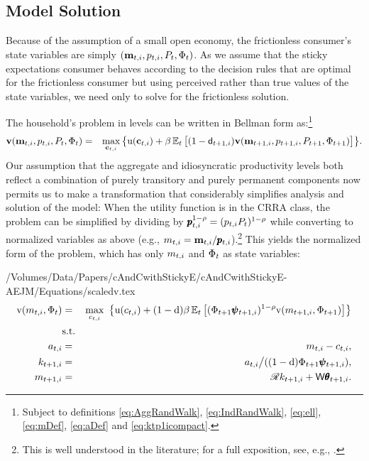 \subsection{Model Solution}

Because of the assumption of a small open economy, the frictionless consumer's state variables are simply $(\mathbf{m}_{t,i},p_{t,i},P_t,\Phi_t)$.  As we assume that the sticky expectations consumer behaves according to the decision rules that are optimal for the frictionless consumer but using perceived rather than true values of the state variables, we need only to solve for the frictionless solution.

The household's problem in levels can be written in Bellman form as:\footnote{Subject to definitions \eqref{eq:AggRandWalk}, \eqref{eq:IndRandWalk}, \eqref{eq:ell}, \eqref{eq:mDef}, \eqref{eq:aDef} and \eqref{eq:ktp1icompact}.}
\begin{eqnarray*}
\textbf{v}(\mathbf{m}_{t,i},p_{t,i},P_t,\Phi_t)  & = &  \max_{\mathbf{c}_{t,i}}  \big\{ {\mathrm{u}}(\mathbf{c}_{t,i}) + \beta \operatorname{\mathbb{E}}_t \big[(1-\mathsf{d}_{t+1,i})\textbf{v}(\mathbf{m}_{t+1,i},p_{t+1,i},P_{t+1},\Phi_{t+1})\big] \big\}. \nonumber
\end{eqnarray*}
Our assumption that the aggregate and idiosyncratic productivity levels both reflect a combination of purely transitory and purely permanent components now permits us to make a transformation that considerably simplifies analysis and solution of the model: When the utility function is in the CRRA class, the problem can be simplified by dividing by $\pmb{p}_{t,i}^{1-\rho} = (p_{t,i}P_t)^{1-\rho}$ while converting to normalized variables as above (e.g., $m_{t,i}=\mathbf{m}_{t,i}/\pmb{p}_{t,i}$).\footnote{This is well understood in the literature; for a full exposition, see, e.g., \cite{BufferStockTheory}.}  This yields the normalized form of the problem, which has only $m_{t,i}$ and $\Phi_t$ as state variables:
\begin{verbatimwrite}{/Volumes/Data/Papers/cAndCwithStickyE/cAndCwithStickyE-AEJM/Equations/scaledv.tex}
\begin{eqnarray}
    \mathrm{v}({m}_{t,i},\Phi_t) & = & \max_{c_{t,i}} ~ \big\{ {\mathrm{u}}(c_{t,i}) + (1-\mathrm{d}) \beta
    \operatorname{\mathbb{E}}_{t}\big[ (\Phi_{t+1} \pmb{\psi}_{t+1,i})^{1-\rho}\mathrm{v}(m_{t+1,i},\Phi_{t+1})\big] \big\}
    \label{eq:scaledv}
\\  & \mbox{s.t.} & \nonumber
\\    a_{t,i}   & = & m_{t,i} - c_{t,i}, \nonumber
\\    k_{t+1,i} & = & a_{t,i} \big/( (1-\mathrm{d}) \Phi_{t+1} \pmb{\psi}_{t+1,i} ),  \nonumber
\\    m_{t+1,i} & = & \mathscr{R} k_{t+1,i} + \mathsf{W} \pmb{\theta}_{t+1,i}.  \nonumber
\end{eqnarray}
\end{verbatimwrite}


